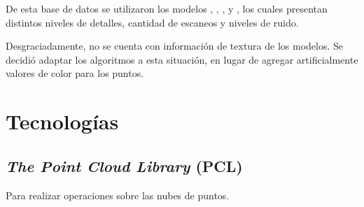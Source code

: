 De esta base de datos se utilizaron los modelos
	,
	,
	,
	 y
	,
los cuales presentan distintos niveles de detalles, cantidad de escaneos y niveles de ruido.



Desgraciadamente, no se cuenta con información de textura de los modelos.
Se decidió adaptar los algoritmos a esta situación, en lugar de agregar
artificialmente valores de color para los puntos.


\section{Tecnologías}
\subsection{\emph{The Point Cloud Library} (PCL)}
Para realizar operaciones sobre las nubes de puntos.
